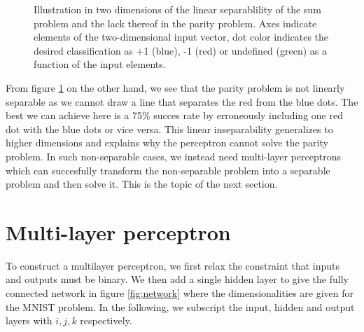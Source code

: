 \documentclass{article}
\begin{document}
\begin{figure}[h]
\begin{subfigure}[t]{0.36\linewidth}
		\label{fig:prod2d}
	\end{subfigure}%
\caption{Illustration in two dimensions of the linear separablility of the sum problem and the lack thereof in the parity problem. Axes indicate elements of the two-dimensional input vector, dot color indicates the desired classification as +1 (blue), -1 (red) or undefined (green) as a function of the input elements.}
\label{fig:2dproj}
\end{figure}

\newpage

From figure \ref{fig:prod2d} on the other hand, we see that the parity problem is not linearly separable as we cannot draw a line that separates the red from the blue dots. The best we can achieve here is a 75\% succes rate by erroneously including one red dot with the blue dots or vice versa. This linear inseparability generalizes to higher dimensions and explains why the perceptron cannot solve the parity problem.
In such non-separable cases, we instead need multi-layer perceptrons which can succesfully transform the non-separable problem into a separable problem and then solve it. This is the topic of the next section.

\newpage













\section{Multi-layer perceptron}

To construct a multilayer perceptron, we first relax the constraint that inputs and outputs must be binary. We then add a single hidden layer to give the fully connected network in figure \ref{fig:network} where the dimensionalities are given for the MNIST problem. In the following, we subscript the input, hidden and output layers with $i, j, k$ respectively.
\end{document}
